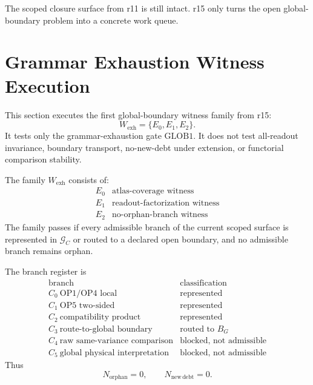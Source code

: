 \begin{remark}
The scoped closure surface from r11 is still intact.  r15 only turns the open
global-boundary problem into a concrete work queue.
\end{remark}



\section{Grammar Exhaustion Witness Execution}
\label{sec:v450-r16-execute-wexh-grammar-exhaustion}

This section executes the first global-boundary witness family from r15:
\[
    W_{\mathrm{exh}}=\{E_0,E_1,E_2\}.
\]
It tests only the grammar-exhaustion gate \(\mathrm{GLOB1}\).  It does not
test all-readout invariance, boundary transport, no-new-debt under extension,
or functorial comparison stability.

\begin{definition}
The family \(W_{\mathrm{exh}}\) consists of:
\[
\begin{array}{c|l}
E_0 & \text{atlas-coverage witness}\\
E_1 & \text{readout-factorization witness}\\
E_2 & \text{no-orphan-branch witness}
\end{array}
\]
The family passes if every admissible branch of the current scoped surface is
represented in \(\mathcal G_C\) or routed to a declared open boundary, and no
admissible branch remains orphan.
\end{definition}

\begin{proposition}
The branch register is
\[
\begin{array}{c|c}
\text{branch} & \text{classification}\\
\hline
C_0\ \text{OP1/OP4 local} & \text{represented}\\
C_1\ \text{OP5 two-sided} & \text{represented}\\
C_2\ \text{compatibility product} & \text{represented}\\
C_3\ \text{route-to-global boundary} & \text{routed to }B_G\\
C_4\ \text{raw same-variance comparison} & \text{blocked, not admissible}\\
C_5\ \text{global physical interpretation} & \text{blocked, not admissible}
\end{array}
\]
Thus
\[
    N_{\mathrm{orphan}}=0,
    \qquad
    N_{\mathrm{new\,debt}}=0.
\]
\end{proposition}

